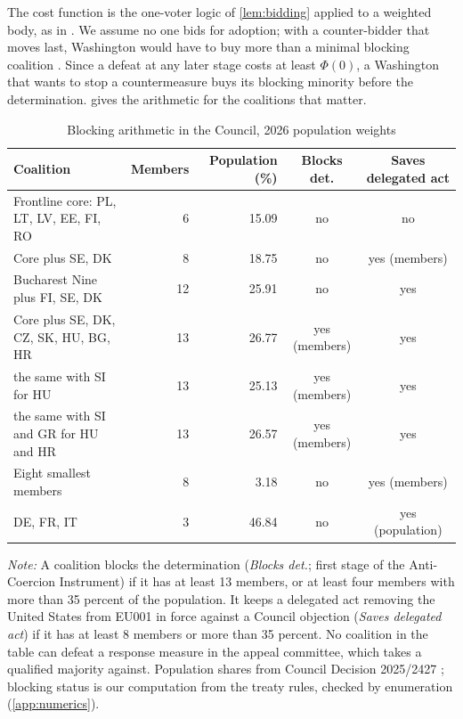 The cost function is the one-voter logic of \cref{lem:bidding} applied to a weighted body, as in \citet{groseclose1996buying}. We assume no one bids for adoption; with a counter-bidder that moves last, Washington would have to buy more than a minimal blocking coalition \citep{groseclose1996buying, banks2000buying}. Since a defeat at any later stage costs at least $\Phi(0)$, a Washington that wants to stop a countermeasure buys its blocking minority before the determination.  gives the arithmetic for the coalitions that matter.

\begin{table}[t]
\centering
\small
\caption{Blocking arithmetic in the Council, 2026 population weights}\label{tab:council}
\begin{tabularx}{\textwidth}{@{}>{\raggedright\arraybackslash}Xrrcc@{}}
\toprule
Coalition & Members & Population (\%) & Blocks det. & Saves delegated act\\
\midrule
Frontline core: PL, LT, LV, EE, FI, RO & 6 & 15.09 & no & no\\
Core plus SE, DK & 8 & 18.75 & no & yes (members)\\
Bucharest Nine plus FI, SE, DK & 12 & 25.91 & no & yes\\
Core plus SE, DK, CZ, SK, HU, BG, HR & 13 & 26.77 & yes (members) & yes\\
\quad the same with SI for HU & 13 & 25.13 & yes (members) & yes\\
\quad the same with SI and GR for HU and HR & 13 & 26.57 & yes (members) & yes\\
Eight smallest members & 8 & 3.18 & no & yes (members)\\
DE, FR, IT & 3 & 46.84 & no & yes (population)\\
\bottomrule
\end{tabularx}
\begin{minipage}{\textwidth}\footnotesize\vspace{4pt}
\emph{Note:} A coalition blocks the determination (\emph{Blocks det.}; first stage of the Anti-Coercion Instrument) if it has at least 13 members, or at least four members with more than 35 percent of the population. It keeps a delegated act removing the United States from EU001 in force against a Council objection (\emph{Saves delegated act}) if it has at least 8 members or more than 35 percent. No coalition in the table can defeat a response measure in the appeal committee, which takes a qualified majority against. Population shares from Council Decision 2025/2427 \citep{council2025population}; blocking status is our computation from the treaty rules, checked by enumeration (\cref{app:numerics}).
\end{minipage}
\end{table}

